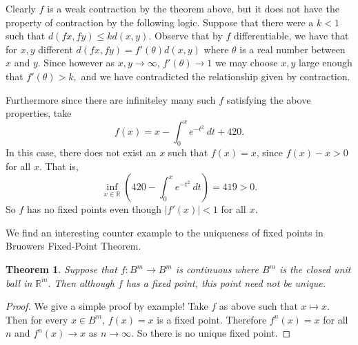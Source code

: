\documentclass[letter]{article}
\newtheorem{theorem}{Theorem}
\newenvironment{menumerate}{%
  \edef\backupindent{\the\parindent}%
  \enumerate%
  \setlength{\parindent}{\backupindent}%
}{\endenumerate}
\begin{document}
\begin{menumerate}
Clearly $f$ is a weak contraction by the theorem above, but it does not have the property of 
contraction by the following logic. Suppose that there were a $k < 1$ such that $d(fx,fy) \leq kd(x,y).$ Observe that by $f$ differentiable, we have that
for $x,y$ different $d(fx,fy) = f'(\theta)d(x,y)$ where $\theta$ is a real number between $x$ and $y.$ Since however as $x,y \to \infty$, $f'(\theta) \to 1$
we may choose $x,y$ large enough that $f'(\theta) > k,$ and we have contradicted the relationship given by contraction.

Furthermore since there are infiniteley many such $f$ satisfying the above properties, take 
$$f(x) = x - \int_0^x e^{-t^2}\ dt + 420.$$
In this case, there does not exist an $x$ such that $f(x) = x$, since $f(x) - x > 0$ for all $x.$
That is, $$\inf_{x\in \mathbb{R}}\left(420 - \int_0^x e^{-t^2}\ dt\right) = 419 > 0.$$ 
So $f$ has no fixed points even though $|f'(x)| < 1$ for all $x.$



\item We find an interesting counter example to the uniqueness of fixed points in Bruowers Fixed-Point Theorem.
\begin{theorem}
	Suppose that $f:B^m \to B^m$ is continuous where $B^m$ is the closed unit ball in $\mathbb{R}^m.$ Then although $f$ has 
	a fixed point, this point need not be unique.
\end{theorem}
\begin{proof}
	We give a simple proof by example! Take $f$ as above such that $x \mapsto x.$ Then for every $x\in B^m$, $f(x) = x$ is a fixed point.
	Therefore $f^n(x) = x$ for all $n$ and $f^n(x) \to x$ as $n \to \infty.$ So there is no unique fixed point.
\end{proof}
\end{menumerate}
\end{document}
